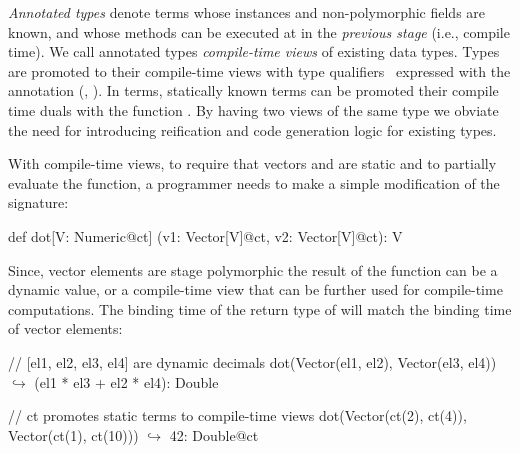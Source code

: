 \emph{Annotated types} denote terms whose instances and non-polymorphic fields are known, and
 whose methods can be executed at in the \emph{previous stage} (i.e., compile time). We call annotated types \emph{compile-time views}
 of existing data types. Types are promoted to their compile-time views with type qualifiers~\cite{foster1999theory} expressed with
 the  annotation (\eg, ). In terms, statically known terms can be promoted
 their compile time duals with the function . By having two views of the same type
 we obviate the need for introducing reification and code generation logic for existing types.

With compile-time views, to require that vectors  and  are
 static and to partially evaluate the function, a programmer needs to make
 a simple modification of the  signature:\begin{lstparagraph}
def dot[V: Numeric@ct]
  (v1: Vector[V]@ct, v2: Vector[V]@ct): V
\end{lstparagraph}

Since, vector elements are stage polymorphic the result
 of the function can be a dynamic value, or a compile-time view
 that can be further used for compile-time computations. The binding time of
 the return type of  will match the binding time of vector elements:\begin{lstparagraph}
  // [el1, el2, el3, el4] are dynamic decimals
  dot(Vector(el1, el2), Vector(el3, el4))
    $\hookrightarrow$ (el1 * el3 + el2 * el4): Double

  // ct promotes static terms to compile-time views
  dot(Vector(ct(2), ct(4)), Vector(ct(1), ct(10)))
    $\hookrightarrow$ 42: Double@ct
\end{lstparagraph}


